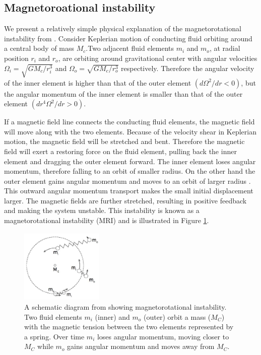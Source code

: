 \documentclass{jfm}
\begin{document}
%
%
\subsection{Magnetoroational instability}
We present a relatively simple physical explanation of the magnetorotational 
instability from \cite{Balbus2011}. Consider Keplerian motion of conducting 
fluid orbiting around a central body of mass $M_c$.Two adjacent fluid elements 
$m_i$ and $m_o$, at radial position $r_i$ and $r_o$, are orbiting around 
gravitational center with angular velocities $\Omega_i=\sqrt{GM_c / r_i^{3}}$ 
and $\Omega_o=\sqrt{GM_c / r_o^{3}}$ respectively. Therefore the angular 
velocity of the inner element is higher than that of the outer element 
$\left(d \Omega^2 / dr < 0 \right)$, but the angular momentum of the inner 
element is smaller than that of the outer element 
$\left(d r^4\Omega^2 / dr > 0 \right)$.

If a magnetic field line connects the conducting fluid elements, the 
magnetic field will move along with the two elements. Because of the velocity
shear in Keplerian motion, the magnetic field will be stretched and bent. 
Therefore the magnetic field will exert a restoring force on the fluid element, 
pulling back the inner element and dragging the outer element forward. 
The inner element loses angular momentum, therefore falling to an orbit of
smaller radius. On the other hand the outer element gains angular momentum and
moves to an orbit of larger radius \citep{Balbus2011}. This 
outward angular momentum transport makes the small initial displacement 
larger. The magnetic fields are further stretched, resulting in positive feedback
 and making the system unstable. This instability is known as a magnetorotational 
instability (MRI) and is illustrated in Figure \ref{fig:mri}.

\begin{figure}
    \centering
    \includegraphics[width=0.35\textwidth]{Balbus2009_diagram}
        \caption{A schematic diagram from \cite{Balbus2011} showing magnetorotational instability. Two fluid elements $m_i$ (inner) and $m_o$ (outer) orbit a mass ($M_C$) with the magnetic tension between the two elements represented by a spring. Over time $m_i$ loses angular momentum, moving closer to $M_C$ while $m_o$ gains angular momentum and moves away from $M_C$.}
        \label{fig:mri}
\end{figure}
\end{document}
